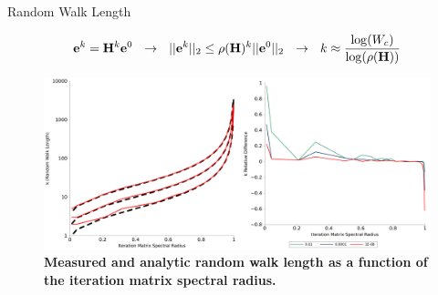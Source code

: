 \documentclass{beamer}
\begin{document}
\begin{frame}{Random Walk Length}

  \[
  \ve{e}^{k} = \ve{H}^k\ve{e}^0 \ \ \rightarrow \ \ ||\ve{e}^{k}||_2
  \leq \rho(\ve{H})^k ||\ve{e}^0||_2 \ \ \rightarrow \ \ k \approx
  \frac{ \log(W_c) }{ \log( \rho(\ve{H}) ) }
  \]

  \bigskip
  \begin{figure}[t!]
    \begin{center}
      \includegraphics[width=4.5in,clip]{measured_length_2.pdf}
    \end{center}
    \caption{\textbf{Measured and analytic random walk length as a
        function of the iteration matrix spectral radius.}}
  \end{figure}

\end{frame}
\end{document}
